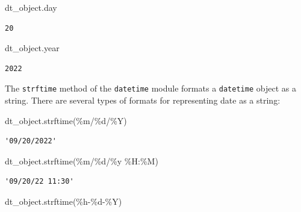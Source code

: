 \documentclass[
  letterpaper,
  DIV=11,
  numbers=noendperiod]{scrreprt}
\newenvironment{Shaded}{\begin{snugshade}}{\end{snugshade}}
\newcommand{\NormalTok}[1]{\textcolor[rgb]{0.00,0.23,0.31}{#1}}
\newcommand{\SpecialCharTok}[1]{\textcolor[rgb]{0.37,0.37,0.37}{#1}}
\newcommand{\StringTok}[1]{\textcolor[rgb]{0.13,0.47,0.30}{#1}}
\begin{document}
\begin{Shaded}
\begin{Highlighting}[]
\NormalTok{dt\_object.day}
\end{Highlighting}
\end{Shaded}

\begin{verbatim}
20
\end{verbatim}

\begin{Shaded}
\begin{Highlighting}[]
\NormalTok{dt\_object.year}
\end{Highlighting}
\end{Shaded}

\begin{verbatim}
2022
\end{verbatim}

The \texttt{strftime} method of the \texttt{datetime} module formats a
\texttt{datetime} object as a string. There are several types of formats
for representing date as a string:

\begin{Shaded}
\begin{Highlighting}[]
\NormalTok{dt\_object.strftime(}\StringTok{\textquotesingle{}\%m/}\SpecialCharTok{\%d}\StringTok{/\%Y\textquotesingle{}}\NormalTok{)}
\end{Highlighting}
\end{Shaded}

\begin{verbatim}
'09/20/2022'
\end{verbatim}

\begin{Shaded}
\begin{Highlighting}[]
\NormalTok{dt\_object.strftime(}\StringTok{\textquotesingle{}\%m/}\SpecialCharTok{\%d}\StringTok{/\%y \%H:\%M\textquotesingle{}}\NormalTok{)}
\end{Highlighting}
\end{Shaded}

\begin{verbatim}
'09/20/22 11:30'
\end{verbatim}

\begin{Shaded}
\begin{Highlighting}[]
\NormalTok{dt\_object.strftime(}\StringTok{\textquotesingle{}\%h{-}}\SpecialCharTok{\%d}\StringTok{{-}\%Y\textquotesingle{}}\NormalTok{)}
\end{Highlighting}
\end{Shaded}
\end{document}
